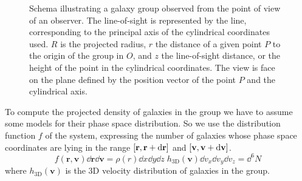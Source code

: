 \begin{figure}
    \centering
    \caption{Schema illustrating a galaxy group observed from the point of view
        of an observer. The line-of-sight is represented by the line,
        corresponding to the principal axis of the cylindrical coordinates
        used. $R$ is the projected radius, $r$ the distance of a given point
        $P$ to the origin of the group in $O$, and $z$ the line-of-sight
        distance, or the height of the point in the cylindrical coordinates.
        The view is face on the plane defined by the position vector of the
    point $P$ and the cylindrical axis.\label{fig:schema}}
\end{figure}

To compute the projected density of galaxies in the group we have to assume
some models for their phase space distribution. So we use the distribution
function $f$ of the system, expressing the number of galaxies whose phase space
coordinates are lying in the range $\left[{\bf r}, {\bf r}+{\bf {\rm{d}} r}\right]$
and $\left[{\bf v}, {\bf v}+{\bf {\rm{d}} v}\right]$.
%
\begin{equation}
    f\left(\textbf{r},\textbf{v}\right)\dd\textbf{r}\dd\textbf{v}
    =\rho\left(r\right)\dd{x}\dd{y}\dd{z}\;
    h_\mathrm{3D}\left(\textbf{v}\right)
    \dd v_x\dd v_y\dd v_z=
    \dd^6 N
\end{equation}
%
where $h_\mathrm{3D}\left(\textbf{v}\right)$ is the 3D velocity distribution of
galaxies in the group.

